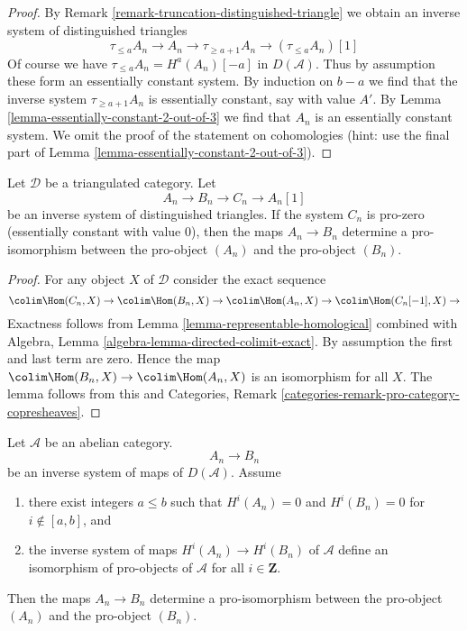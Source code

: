 \begin{proof}
By Remark \ref{remark-truncation-distinguished-triangle} we obtain
an inverse system of distinguished triangles
$$
\tau_{\leq a}A_n \to A_n \to \tau_{\geq a + 1}A_n \to (\tau_{\leq a}A_n)[1]
$$
Of course we have $\tau_{\leq a}A_n = H^a(A_n)[-a]$ in $D(\mathcal{A})$.
Thus by assumption these form an essentially constant system.
By induction on $b - a$ we find that the inverse system
$\tau_{\geq a + 1}A_n$ is essentially constant, say with value $A'$.
By Lemma \ref{lemma-essentially-constant-2-out-of-3} we find that
$A_n$ is an essentially constant system. We omit the proof of
the statement on cohomologies (hint: use the final part of
Lemma \ref{lemma-essentially-constant-2-out-of-3}).
\end{proof}

\begin{lemma}
\label{lemma-pro-isomorphism}
Let $\mathcal{D}$ be a triangulated category. Let
$$
A_n \to B_n \to C_n \to A_n[1]
$$
be an inverse system of distinguished triangles. If the system $C_n$
is pro-zero (essentially constant with value $0$), then the maps
$A_n \to B_n$ determine a pro-isomorphism between the pro-object $(A_n)$
and the pro-object $(B_n)$.
\end{lemma}

\begin{proof}
For any object $X$ of $\mathcal{D}$ consider the exact sequence
$$
\colim \Hom(C_n, X) \to
\colim \Hom(B_n, X) \to
\colim \Hom(A_n, X) \to
\colim \Hom(C_n[-1], X) \to
$$
Exactness follows from Lemma \ref{lemma-representable-homological}
combined with
Algebra, Lemma \ref{algebra-lemma-directed-colimit-exact}.
By assumption the first and last term are zero. Hence the map
$\colim \Hom(B_n, X) \to \colim \Hom(A_n, X)$ is an isomorphism
for all $X$. The lemma follows from this and
Categories, Remark \ref{categories-remark-pro-category-copresheaves}.
\end{proof}

\begin{lemma}
\label{lemma-pro-isomorphism-bis}
Let $\mathcal{A}$ be an abelian category.
$$
A_n \to B_n
$$
be an inverse system of maps of $D(\mathcal{A})$. Assume
\begin{enumerate}
\item there exist integers $a \leq b$ such that $H^i(A_n) = 0$
and $H^i(B_n) = 0$ for $i \not \in [a, b]$, and
\item the inverse system of maps $H^i(A_n) \to H^i(B_n)$ of $\mathcal{A}$
define an isomorphism of pro-objects of $\mathcal{A}$
for all $i \in \mathbf{Z}$.
\end{enumerate}
Then the maps $A_n \to B_n$
determine a pro-isomorphism between the pro-object $(A_n)$
and the pro-object $(B_n)$.
\end{lemma}

